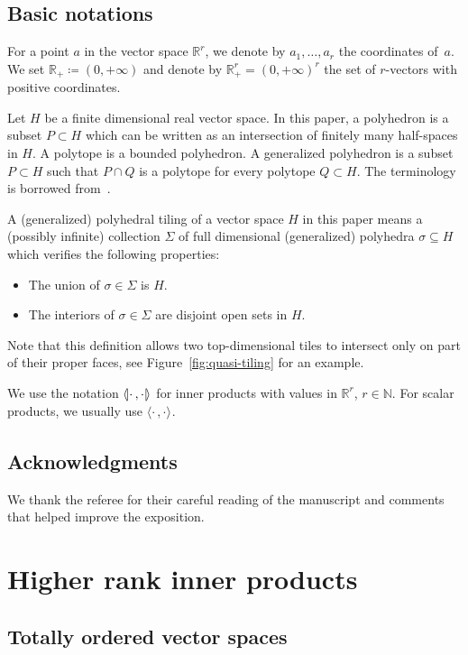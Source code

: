 \documentclass[AHL,Unicode,longabstracts]{cedram}
\newcommand{\innone}[2]{{\langle#2\rangle_{#1}}}
\newcommand{\llangle}{\mathopen{\langle\mkern -3.1mu\lvert}}
\newcommand{\rrangle}{\mathclose{\rvert\mkern -3.1mu\rangle}}
\newcommand{\highinn}[2]{{\llangle#2\rrangle_{#1}}}
\newcommand{\R}{\mathbb{R}}
\newcommand{\N}{\mathbb{N}}
\begin{document}
\subsection*{Basic notations} \label{ss:BasicNotations}
For a point $a$ in the vector space $\R^r$, we denote by $a_1, \dots, a_r$ the coordinates of~$a$. We set $\R_+ \coloneqq (0, +\infty)$ and denote by $\R_+^r =(0,+\infty)^r$ the set of $r$-vectors with positive coordinates.

Let $H$ be a finite dimensional real vector space. In this paper, a polyhedron is a subset $P \subset H$ which can be written as an intersection of finitely many half-spaces in $H$. A polytope is a bounded polyhedron. A generalized polyhedron is a subset $P \subset H$ such that $P \cap Q$ is a polytope for every polytope $Q \subset H$. The terminology is borrowed from~\cite[p.~250]{Gruber}.


A (generalized) polyhedral tiling of a vector space $H$ in this paper means a (possibly infinite) collection $\Sigma$ of full dimensional (generalized) polyhedra $\sigma \subseteq H$ which verifies the following properties:
\begin{itemize}
\item The union of $\sigma \in \Sigma$ is $H$.
\item The interiors of $\sigma \in \Sigma$ are disjoint open sets in $H$.
\end{itemize}

Note that this definition allows two top-dimensional tiles to intersect only on part of their proper faces, see Figure~\ref{fig:quasi-tiling} for an example.


We use the notation $\highinn{}{\cdot\,,\cdot}$ for inner products with values in $\R^r$, $r\in \N$. For scalar products, we usually use $\innone{}{\cdot\,,\cdot}$.

\subsection*{Acknowledgments}
We thank the referee for their careful reading of the manuscript and comments that helped improve the exposition. 


\section{Higher rank inner products} \label{sec:HigherRankInnerProducts}

\subsection{Totally ordered vector spaces}
\end{document}
